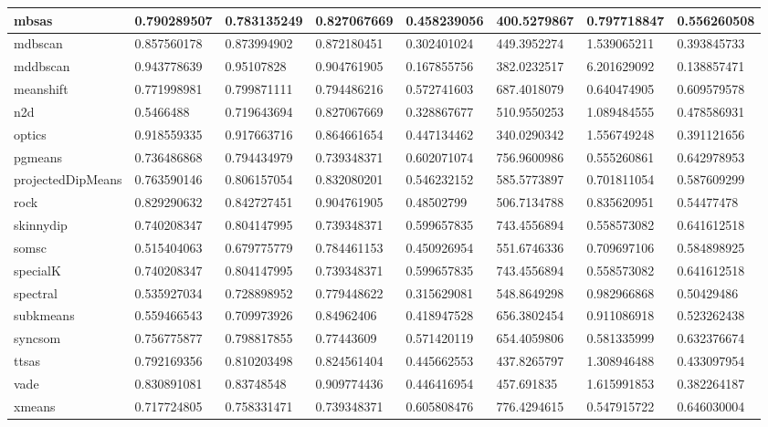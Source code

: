 \begin{table}[H]
\begin{tabular}{|l|l|l|l|l|l|l|l|}
\hline
mbsas & 0.790289507 & 0.783135249 & 0.827067669 & 0.458239056 & 400.5279867 & 0.797718847 & 0.556260508 \\
\hline
mdbscan & 0.857560178 & 0.873994902 & 0.872180451 & 0.302401024 & 449.3952274 & 1.539065211 & 0.393845733 \\
\hline
mddbscan & 0.943778639 & 0.95107828 & 0.904761905 & 0.167855756 & 382.0232517 & 6.201629092 & 0.138857471 \\
\hline
meanshift & 0.771998981 & 0.799871111 & 0.794486216 & 0.572741603 & 687.4018079 & 0.640474905 & 0.609579578 \\
\hline
n2d & 0.5466488 & 0.719643694 & 0.827067669 & 0.328867677 & 510.9550253 & 1.089484555 & 0.478586931 \\
\hline
optics & 0.918559335 & 0.917663716 & 0.864661654 & 0.447134462 & 340.0290342 & 1.556749248 & 0.391121656 \\
\hline
pgmeans & 0.736486868 & 0.794434979 & 0.739348371 & 0.602071074 & 756.9600986 & 0.555260861 & 0.642978953 \\
\hline
projectedDipMeans & 0.763590146 & 0.806157054 & 0.832080201 & 0.546232152 & 585.5773897 & 0.701811054 & 0.587609299 \\
\hline
rock & 0.829290632 & 0.842727451 & 0.904761905 & 0.48502799 & 506.7134788 & 0.835620951 & 0.54477478 \\
\hline
skinnydip & 0.740208347 & 0.804147995 & 0.739348371 & 0.599657835 & 743.4556894 & 0.558573082 & 0.641612518 \\
\hline
somsc & 0.515404063 & 0.679775779 & 0.784461153 & 0.450926954 & 551.6746336 & 0.709697106 & 0.584898925 \\
\hline
specialK & 0.740208347 & 0.804147995 & 0.739348371 & 0.599657835 & 743.4556894 & 0.558573082 & 0.641612518 \\
\hline
spectral & 0.535927034 & 0.728898952 & 0.779448622 & 0.315629081 & 548.8649298 & 0.982966868 & 0.50429486 \\
\hline
subkmeans & 0.559466543 & 0.709973926 & 0.84962406 & 0.418947528 & 656.3802454 & 0.911086918 & 0.523262438 \\
\hline
syncsom & 0.756775877 & 0.798817855 & 0.77443609 & 0.571420119 & 654.4059806 & 0.581335999 & 0.632376674 \\
\hline
ttsas & 0.792169356 & 0.810203498 & 0.824561404 & 0.445662553 & 437.8265797 & 1.308946488 & 0.433097954 \\
\hline
vade & 0.830891081 & 0.83748548 & 0.909774436 & 0.446416954 & 457.691835 & 1.615991853 & 0.382264187 \\
\hline
xmeans & 0.717724805 & 0.758331471 & 0.739348371 & 0.605808476 & 776.4294615 & 0.547915722 & 0.646030004 \\
\hline
\end{tabular}
\end{table}